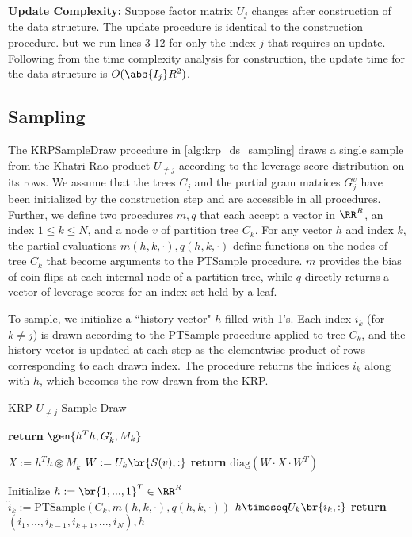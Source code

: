 \textbf{Update Complexity: } Suppose factor matrix $U_j$ changes after
construction of the data structure.
The update procedure is identical to the construction
procedure. but we run lines 3-12 for only the index $j$ that
requires an update. Following from the time complexity analysis
for construction, the update time for the data structure is 
$O(\abs{I_j} R^2)$.

\subsection{Sampling}
\label{sec:sampling}
The KRPSampleDraw procedure in \ref{alg:krp_ds_sampling} draws a 
single sample from the Khatri-Rao product $U_{\neq j}$ according to
the leverage score distribution on its rows. We assume that the 
trees $C_j$ and the partial gram
matrices $G_j^v$ have been initialized by the construction step
and are accessible in all procedures. Further, we define
two procedures $m, q$ that each accept a vector in $\RR^R$, an
index $1 \leq k \leq N$, and a node $v$ of partition tree
$C_k$. For any vector $h$ and index $k$, the partial evaluations
$m(h, k, \cdot), q(h, k, \cdot)$ define functions on the nodes 
of tree $C_k$ that become arguments to the $\textrm{PTSample}$
procedure. $m$ provides the bias of coin flips at each internal
node of a partition tree, while $q$ directly returns a vector of leverage
scores for an index set held by a leaf.

To sample, we initialize
a ``history vector" $h$ filled with 1's. Each index 
$i_k$ (for $k \neq j$) is drawn according to the 
PTSample procedure applied to tree $C_k$, and the history
vector is updated at each step as the elementwise product
of rows corresponding to each drawn index. The procedure
returns the indices $i_k$ along with $h$, which becomes 
the row drawn from the KRP.

\begin{algorithm}[H]
\caption{KRP $U_{\neq j}$ Sample Draw}
\begin{algorithmic}[1]
        \State \textbf{return} $\gen{h^T h, G_k^v, M_k}$
    \EndProcedure

        \State $X := h^T h \circledast M_k$
        \State $W := U_k\br{S(v), :}$
        \State \textbf{return} $\textrm{diag}(W \cdot X \cdot W^T)$
    \EndProcedure

        \State Initialize $h := \br{1, ..., 1}^T \in \RR^R$
            \State $\hat i_k := \textrm{PTSample}(C_k, m(h, k, \cdot), q(h, k, \cdot))$ 
            \State $h \timeseq U_k \br{i_k, :}$
        \EndFor
        \State \textbf{return} $(i_1, ..., i_{k-1}, i_{k+1}, ..., i_N), h$
    \EndProcedure 
\end{algorithmic}
\label{alg:krp_ds_sampling}
\end{algorithm}

